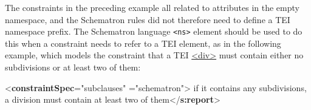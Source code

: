 The constraints in the preceding example all related to attributes in the empty namespace, and the Schematron rules did not therefore need to define a TEI namespace prefix. The Schematron language \texttt{<ns>} element should be used to do this when a constraint needs to refer to a TEI element, as in the following example, which models the constraint that a TEI \hyperref[TEI.div]{<div>} must contain either no subdivisions or at least two of them: \par\bgroup{}\exampleFont \begin{shaded}\noindent\mbox{}{<\textbf{constraintSpec}\hspace*{1em}{ident}="{subclauses}"\mbox{}\newline 
\hspace*{1em}{scheme}="{schematron}">}\mbox{}\newline 
{}\mbox{}\newline 
\hspace*{1em}\mbox{}\newline 
\hspace*{1em}\mbox{}\newline 
\hspace*{1em}\hspace*{1em}if it contains any subdivisions, a\mbox{}\newline 
\hspace*{1em}\hspace*{1em}\hspace*{1em}\hspace*{1em}\hspace*{1em}\hspace*{1em} division must contain at least two of them{</\textbf{s:report}>}\mbox{}\newline 

\end{shaded}
